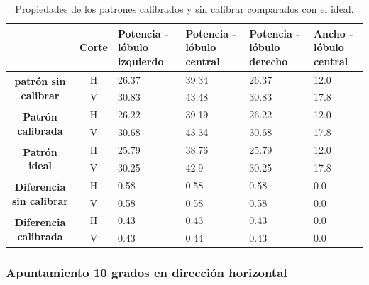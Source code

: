 \begin{table}[H]
  \footnotesize
  \centering
  \begin{tabular}{|c|c|p{2cm}|p{2cm}|p{2cm}|p{2cm}|}
    \cline{2-6}
    \multicolumn{1}{c|}{} & \textbf{Corte} & \textbf{Potencia - lóbulo izquierdo} & \textbf{Potencia - lóbulo central} &
    \textbf{Potencia - lóbulo derecho} & \textbf{Ancho - lóbulo central} \tabularnewline\hline
    \multirow{2}{*}{\textbf{patrón sin calibrar}} & H & 26.37 & 39.34 & 26.37 & 12.0 \tabularnewline\cline{2-6}
     & V & 30.83 & 43.48 & 30.83 & 17.8 \tabularnewline\hline
    \multirow{2}{*}{\textbf{Patrón calibrada}} & H & 26.22 & 39.19 & 26.22 & 12.0 \tabularnewline\cline{2-6}
     & V & 30.68 & 43.34 & 30.68 & 17.8 \tabularnewline\hline
    \multirow{2}{*}{\textbf{Patrón ideal}} & H & 25.79 & 38.76 & 25.79 & 12.0 \tabularnewline\cline{2-6}
     & V & 30.25 & 42.9 & 30.25 & 17.8 \tabularnewline\hline
    \multirow{2}{*}{\textbf{Diferencia sin calibrar}} & H & 0.58 & 0.58 & 0.58 & 0.0\tabularnewline\cline{2-6}
     & V & 0.58 & 0.58 & 0.58 & 0.0 \tabularnewline\hline
    \multirow{2}{*}{\textbf{Diferencia calibrada}} & H & 0.43 & 0.43 & 0.43 & 0.0 \tabularnewline\cline{2-6}
     & V & 0.43 & 0.44 & 0.43 & 0.0 \tabularnewline\hline
  \end{tabular}
  \caption{Propiedades de los patrones calibrados y sin calibrar comparados con el ideal.}
  \label{tab:nonErrMutual0deg}
\end{table}


\subsubsection{Apuntamiento 10 grados en dirección horizontal}

